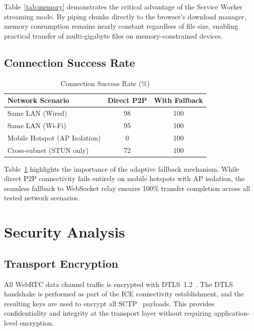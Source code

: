 \documentclass[conference]{IEEEtran}
\begin{document}
Table~\ref{tab:memory} demonstrates the critical advantage of the Service Worker streaming mode. By piping chunks directly to the browser's download manager, memory consumption remains nearly constant regardless of file size, enabling practical transfer of multi-gigabyte files on memory-constrained devices.

\subsection{Connection Success Rate}

\begin{table}[htbp]
\caption{Connection Success Rate (\%)}
\label{tab:successrate}
\centering
\begin{tabular}{@{}lcc@{}}
\toprule
\textbf{Network Scenario} & \textbf{Direct P2P} & \textbf{With Fallback} \\
\midrule
Same LAN (Wired) & 98 & 100 \\
Same LAN (Wi-Fi) & 95 & 100 \\
Mobile Hotspot (AP Isolation) & 0 & 100 \\
Cross-subnet (STUN only) & 72 & 100 \\
\bottomrule
\end{tabular}
\end{table}

Table~\ref{tab:successrate} highlights the importance of the adaptive fallback mechanism. While direct P2P connectivity fails entirely on mobile hotspots with AP isolation, the seamless fallback to WebSocket relay ensures 100\% transfer completion across all tested network scenarios.

\section{Security Analysis}

\subsection{Transport Encryption}
All WebRTC data channel traffic is encrypted with DTLS~1.2~\cite{rfc6347}. The DTLS handshake is performed as part of the ICE connectivity establishment, and the resulting keys are used to encrypt all SCTP~\cite{rfc4960} payloads. This provides confidentiality and integrity at the transport layer without requiring application-level encryption.
\end{document}
